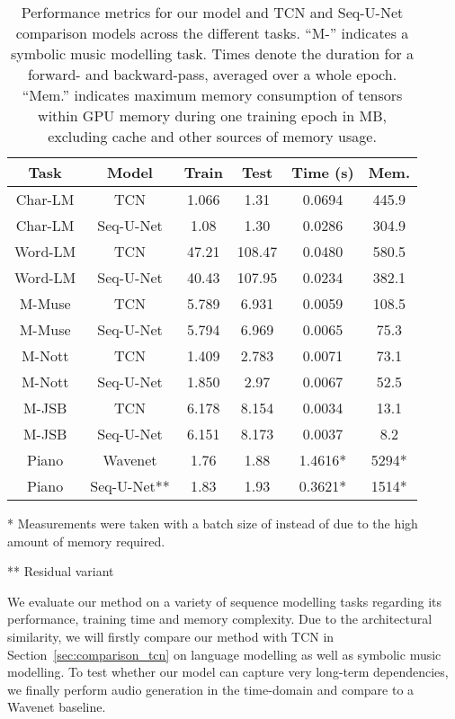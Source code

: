 \documentclass{article}
\begin{document}
\begin{table}[t]
\footnotesize
\centering
\begin{threeparttable}
\setlength{\tabcolsep}{1.15ex}
\begin{tabular}{cccccc}
\toprule
Task & Model & Train & Test & Time (s) & Mem. \\
\midrule
Char-LM & TCN & 1.066 & 1.31 & 0.0694 & 445.9 \\
Char-LM & Seq-U-Net & 1.08 & 1.30 & 0.0286 & 304.9 \\
\midrule
Word-LM & TCN & 47.21 & 108.47 & 0.0480 & 580.5 \\
Word-LM & Seq-U-Net & 40.43 & 107.95 & 0.0234 & 382.1 \\
\midrule
M-Muse & TCN & 5.789 & 6.931 & 0.0059 & 108.5 \\
M-Muse & Seq-U-Net & 5.794 & 6.969 & 0.0065 & 75.3 \\
\midrule
M-Nott & TCN & 1.409 & 2.783 & 0.0071 & 73.1 \\
M-Nott & Seq-U-Net & 1.850 & 2.97 & 0.0067 & 52.5 \\
\midrule
M-JSB & TCN & 6.178 & 8.154 & 0.0034 & 13.1 \\
M-JSB & Seq-U-Net & 6.151 & 8.173 & 0.0037 & 8.2 \\
\midrule
Piano & Wavenet & 1.76 & 1.88 & 1.4616* & 5294* \\
Piano & Seq-U-Net** & 1.83 & 1.93 & 0.3621* & 1514* \\
\bottomrule
\end{tabular}
\begin{tablenotes}
    \footnotesize
    \item[*]{Measurements were taken with a batch size of  instead of  due to the high amount of memory required.}
    \item[**]{Residual variant}
\end{tablenotes}
\end{threeparttable}
\caption{Performance metrics for our model and TCN and Seq-U-Net comparison models across the different tasks. \mbox{``M-''} indicates a symbolic music modelling task. Times denote the duration for a forward- and backward-pass, averaged over a whole epoch. ``Mem.'' indicates maximum memory consumption of tensors within GPU memory during one training epoch in MB, excluding cache and other sources of memory usage.}
\label{tab:results}
\end{table}

We evaluate our method on a variety of sequence modelling tasks regarding its performance, training time and memory complexity.
Due to the architectural similarity, we will firstly compare our method with TCN in Section~\ref{sec:comparison_tcn} on language modelling as well as symbolic music modelling.
To test whether our model can capture very long-term dependencies, we finally perform audio generation in the time-domain and compare to a Wavenet baseline.
\end{document}
